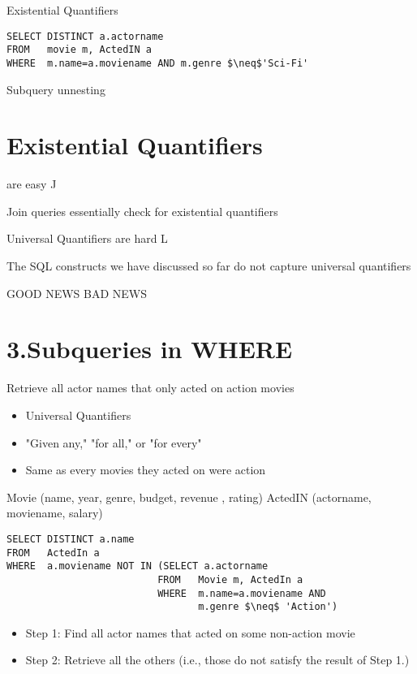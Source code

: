 \documentclass{article}
\begin{document}
Existential Quantifiers

\begin{verbatim}
SELECT DISTINCT a.actorname
FROM   movie m, ActedIN a
WHERE  m.name=a.moviename AND m.genre $\neq$'Sci-Fi'
\end{verbatim}

Subquery unnesting

\section*{Existential Quantifiers}

are easy J

Join queries essentially check for existential quantifiers

Universal Quantifiers are hard L

The SQL constructs we have discussed so far do not capture universal quantifiers

GOOD NEWS BAD NEWS

\section*{3.Subqueries in WHERE}

Retrieve all actor names that only acted on action movies

\begin{itemize}
\item Universal Quantifiers
\item "Given any," "for all," or "for every"
\item Same as every movies they acted on were action
\end{itemize}

Movie (name, year, genre, budget, revenue , rating) ActedIN (actorname, moviename, salary)

\begin{verbatim}
SELECT DISTINCT a.name
FROM   ActedIn a
WHERE  a.moviename NOT IN (SELECT a.actorname
                          FROM   Movie m, ActedIn a
                          WHERE  m.name=a.moviename AND
                                 m.genre $\neq$ 'Action')
\end{verbatim}

\begin{itemize}
\item Step 1: Find all actor names that acted on some non-action movie
\item Step 2: Retrieve all the others (i.e., those do not satisfy the result of Step 1.)
\end{itemize}
\end{document}
